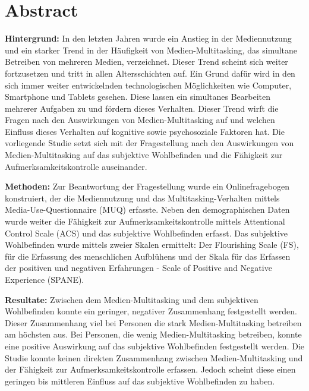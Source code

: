 %
%
\thispagestyle{empty} 
\let\raggedsection\centering
\chapter*{Abstract}\label{label.abstract}
\let\raggedsection\raggedright 
\textbf{Hintergrund:} In den letzten Jahren wurde ein Anstieg in der Mediennutzung und ein starker Trend in der Häufigkeit von Medien-Multitasking, das simultane Betreiben von mehreren Medien, verzeichnet. Dieser Trend scheint sich weiter fortzusetzen und tritt in allen Altersschichten auf. Ein Grund dafür wird in den sich immer weiter entwickelnden technologischen Möglichkeiten wie Computer, Smartphone und Tablets gesehen. Diese lassen ein simultanes Bearbeiten mehrerer Aufgaben zu und fördern dieses Verhalten. Dieser Trend wirft die Fragen nach den Auswirkungen von Medien-Multitasking auf und welchen Einfluss dieses Verhalten auf kognitive sowie psychosoziale Faktoren hat. Die vorliegende Studie setzt sich mit der Fragestellung nach den Auswirkungen von Medien-Multitasking auf das subjektive Wohlbefinden und die Fähigkeit zur Aufmerksamkeitskontrolle auseinander.
\par 
\textbf{Methoden:} Zur Beantwortung der Fragestellung wurde ein Onlinefragebogen konstruiert, der die Mediennutzung und das Multitasking-Verhalten mittels Media-Use-Questionnaire (MUQ) erfasste. Neben den demographischen Daten wurde weiter die Fähigkeit zur Aufmerksamkeitskontrolle mittels Attentional Control Scale (ACS) und das subjektive Wohlbefinden erfasst. Das subjektive Wohlbefinden wurde mittels zweier Skalen ermittelt: Der Flourishing Scale (FS), für die Erfassung des menschlichen Aufblühens und der Skala für das Erfassen der positiven und negativen Erfahrungen - Scale of Positive and Negative Experience (SPANE).
\par 
\textbf{Resultate:} Zwischen dem Medien-Multitasking und dem subjektiven Wohlbefinden konnte ein geringer, negativer Zusammenhang festgestellt werden. Dieser Zusammenhang viel bei Personen die stark Medien-Multitasking betreiben am höchsten  aus. Bei Personen, die wenig Medien-Multitasking betreiben, konnte eine positive Auswirkung auf das subjektive Wohlbefinden festgestellt werden. Die Studie konnte keinen direkten Zusammenhang zwischen Medien-Multitasking und der Fähigkeit zur Aufmerksamkeitskontrolle erfassen. Jedoch scheint diese einen geringen bis mittleren Einfluss auf das subjektive Wohlbefinden zu haben.
